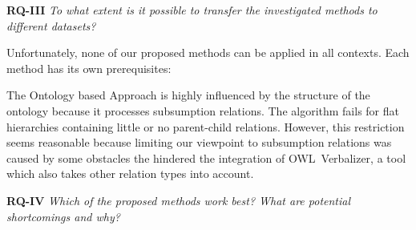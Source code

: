 \textbf{RQ-III} \emph{To what extent is it possible to transfer the investigated methods to different datasets?}

Unfortunately, none of our proposed methods can be applied in all contexts. Each method has its own prerequisites:

The Ontology based Approach is highly influenced by the structure of the ontology because it processes subsumption relations. The algorithm fails 
for flat hierarchies containing little or no parent-child relations. However, this restriction seems reasonable because limiting our viewpoint to subsumption relations was caused by some obstacles the hindered the integration of OWL~Verbalizer, a tool which also takes other relation types into account. 




\textbf{RQ-IV} \emph{Which of the proposed methods work best? What are potential shortcomings and why?} 

